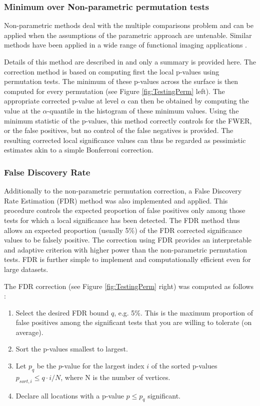 \documentclass{InsightArticle}
\begin{document}
\subsubsection{Minimum over Non-parametric permutation tests}

Non-parametric methods deal with the multiple comparisons problem \cite{PantazisISBI04}  and 
can be applied when the assumptions of the parametric approach are untenable.  Similar methods have
been applied in a wide range of functional imaging applications
\cite{Nichols2001,pantazis2003,sowell1999}. 

Details of this method are described in \cite{PantazisISBI04} and only a summary is provided here. The correction method is based on computing first the local p-values using permutation tests. The minimum of these p-values across the surface is then computed for every permutation (see Figure \ref{fig:TestingPerm} left). The appropriate corrected p-value at level $\alpha$ can then be obtained by computing the value at the $\alpha$-quantile in the histogram of these minimum values. Using the minimum statistic of the p-values, this method correctly controls for the FWER, or the false positives, but no control of the false negatives is provided. The resulting corrected local significance values can thus be regarded as pessimistic estimates akin to a simple Bonferroni correction.

\subsubsection{False Discovery Rate}

Additionally to the non-parametric permutation correction, a False Discovery Rate Estimation (FDR) \cite{FDR1995,FDR2002} method was also implemented and applied. This procedure controls the expected proportion of false positives only among those tests for which a local significance has been detected. The FDR method thus allows an expected proportion (usually 5\%) of the FDR corrected significance values to be falsely positive. The correction using FDR provides an interpretable and adaptive criterion with higher power than the non-parametric permutation tests. FDR is further simple to implement and computationally efficient even for large datasets.

The FDR correction (see Figure \ref{fig:TestingPerm} right) was computed as follows \cite{FDR2002}:
\begin{enumerate}
\item Select the desired FDR bound $q$, e.g. 5\%. This is the maximum proportion of false positives among the significant tests that you are willing to tolerate (on average).
\item Sort the p-values smallest to largest.
\item Let $p_q$ be the $p$-value for the largest index $i$ of the sorted p-values $p_{sort,i} \leq q \cdot i / N$, where N is the number of vertices.
\item Declare all locations with a p-value $p \leq p_q$ significant.
\end{enumerate}
\end{document}
